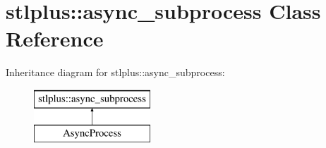 \hypertarget{classstlplus_1_1async__subprocess}{}\section{stlplus\+:\+:async\+\_\+subprocess Class Reference}
\label{classstlplus_1_1async__subprocess}
Inheritance diagram for stlplus\+:\+:async\+\_\+subprocess\+:\begin{figure}[H]
\begin{center}
\leavevmode
\includegraphics[height=2.000000cm]{classstlplus_1_1async__subprocess}
\end{center}
\end{figure}

